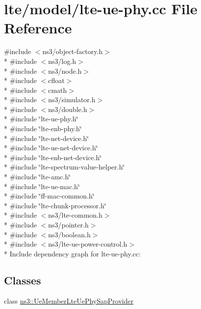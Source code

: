 \hypertarget{lte-ue-phy_8cc}{}\section{lte/model/lte-\/ue-\/phy.cc File Reference}
\label{lte-ue-phy_8cc}
{\ttfamily \#include $<$ns3/object-\/factory.\+h$>$}\\*
{\ttfamily \#include $<$ns3/log.\+h$>$}\\*
{\ttfamily \#include $<$ns3/node.\+h$>$}\\*
{\ttfamily \#include $<$cfloat$>$}\\*
{\ttfamily \#include $<$cmath$>$}\\*
{\ttfamily \#include $<$ns3/simulator.\+h$>$}\\*
{\ttfamily \#include $<$ns3/double.\+h$>$}\\*
{\ttfamily \#include \char`\"{}lte-\/ue-\/phy.\+h\char`\"{}}\\*
{\ttfamily \#include \char`\"{}lte-\/enb-\/phy.\+h\char`\"{}}\\*
{\ttfamily \#include \char`\"{}lte-\/net-\/device.\+h\char`\"{}}\\*
{\ttfamily \#include \char`\"{}lte-\/ue-\/net-\/device.\+h\char`\"{}}\\*
{\ttfamily \#include \char`\"{}lte-\/enb-\/net-\/device.\+h\char`\"{}}\\*
{\ttfamily \#include \char`\"{}lte-\/spectrum-\/value-\/helper.\+h\char`\"{}}\\*
{\ttfamily \#include \char`\"{}lte-\/amc.\+h\char`\"{}}\\*
{\ttfamily \#include \char`\"{}lte-\/ue-\/mac.\+h\char`\"{}}\\*
{\ttfamily \#include \char`\"{}ff-\/mac-\/common.\+h\char`\"{}}\\*
{\ttfamily \#include \char`\"{}lte-\/chunk-\/processor.\+h\char`\"{}}\\*
{\ttfamily \#include $<$ns3/lte-\/common.\+h$>$}\\*
{\ttfamily \#include $<$ns3/pointer.\+h$>$}\\*
{\ttfamily \#include $<$ns3/boolean.\+h$>$}\\*
{\ttfamily \#include $<$ns3/lte-\/ue-\/power-\/control.\+h$>$}\\*
Include dependency graph for lte-\/ue-\/phy.cc\+:
\subsection*{Classes}
\begin{DoxyCompactItemize}
\item 
class \hyperlink{classns3_1_1UeMemberLteUePhySapProvider}{ns3\+::\+Ue\+Member\+Lte\+Ue\+Phy\+Sap\+Provider}
\end{DoxyCompactItemize}
